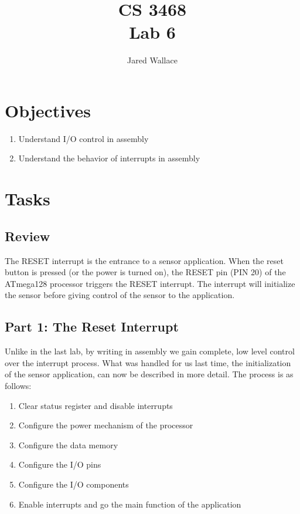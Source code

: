 \documentclass[letterpaper,12pt]{article}
\title{\Large CS 3468\\Lab 6}
\author{Jared Wallace}
\date{}
\begin{document}
\maketitle

\vspace{30mm}

\section*{Objectives}
\begin{enumerate}
\item Understand I/O control in assembly
\item Understand the behavior of interrupts in assembly
\end{enumerate}

\section*{Tasks}
\subsection*{Review}
The RESET interrupt is the entrance to a sensor application. When the reset button is pressed
(or the power is turned on), the RESET pin (PIN 20) of the ATmega128 processor triggers the 
RESET interrupt. The interrupt will initialize the sensor before giving control of the sensor
to the application.

\subsection*{Part 1: The Reset Interrupt}
Unlike in the last lab, by writing in assembly we gain complete, low level control over the
interrupt process. What was handled for us last time, the initialization of the sensor application,
can now be described in more detail. The process is as follows:
\begin{enumerate}
    \item Clear status register and disable interrupts
    \item Configure the power mechanism of the processor
    \item Configure the data memory
    \item Configure the I/O pins
    \item Configure the I/O components
    \item Enable interrupts and go the main function of the application
\end{enumerate}
\end{document}
